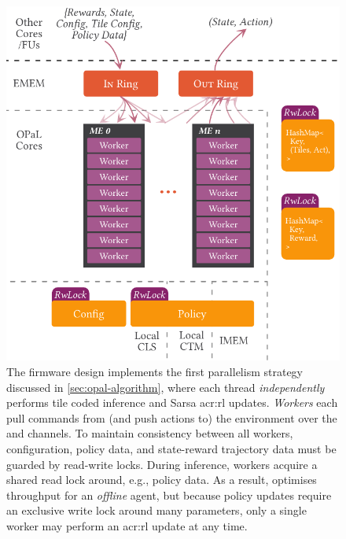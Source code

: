\begin{figure}
	\centering
	\includegraphics[keepaspectratio, width=\linewidth]{diagrams/opal/ind}
	\caption[Architectural diagram for \approachshort{}'s \Indfw{} firmware design.]{The \Indfw{} firmware design implements the first parallelism strategy discussed in \cref{sec:opal-algorithm}, where each thread \emph{independently} performs tile coded inference and Sarsa \gls{acr:rl} updates. \emph{Workers} each pull commands from (and push actions to) the environment over the \inring{} and \outring{} channels. To maintain consistency between all workers, configuration, policy data, and state-reward trajectory data must be guarded by read-write locks. During inference, workers acquire a shared read lock around, e.g., policy data. As a result, \Indfw{} optimises throughput for an \emph{offline} agent, but because policy updates require an exclusive write lock around many parameters, only a single worker may perform an \gls{acr:rl} update at any time.\label{fig:single-and-parallel:single}}
\end{figure}
